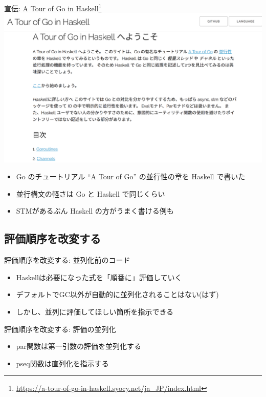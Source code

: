 \documentclass[unicode,12pt]{beamer}
\begin{document}
\begin{frame}{宣伝: A Tour of Go in Haskell\footnote{\url{https://a-tour-of-go-in-haskell.syocy.net/ja_JP/index.html}}}
  \centering
  \includegraphics[width=.55\textwidth]{pic/a_tour_of_go_in_haskell.png}
  \begin{itemize}
  \item Go のチュートリアル ``A Tour of Go'' の並行性の章を Haskell で書いた
  \item 並行構文の軽さは Go と Haskell で同じくらい
  \item STMがあるぶん Haskell の方がうまく書ける例も
  \end{itemize}
\end{frame}

\subsection{評価順序を改変する}

\begin{frame}{評価順序を改変する: 並列化前のコード}
  \begin{itemize}
  \item Haskellは必要になった式を「順番に」評価していく
  \item デフォルトでGC以外が自動的に並列化されることはない(はず)
  \item しかし、\alert{並列に評価してほしい箇所を指示}できる
  \end{itemize}
  
\end{frame}

\begin{frame}{評価順序を改変する: 評価の並列化}
  \begin{itemize}
    \item {\ttfamily par}関数は第一引数の評価を並列化する
    \item {\ttfamily pseq}関数は直列化を指示する
  \end{itemize}
  
\end{frame}
\end{document}
